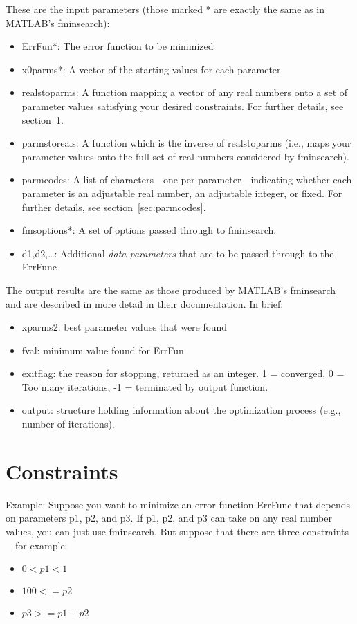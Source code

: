 \documentclass{article}
\begin{document}
These are the input parameters (those marked * are exactly the same as in MATLAB's fminsearch):
\begin{itemize}
\item ErrFun*:  The error function to be minimized
\item x0parms*: A vector of the starting values for each parameter
\item realstoparms: A function mapping a vector of any real numbers onto a set of parameter values
                    satisfying your desired constraints.  For further details, see section~\ref{sec:constraints}.
\item parmstoreals: A function which is the inverse of realstoparms (i.e., maps your parameter values
                    onto the full set of real numbers considered by fminsearch).
\item parmcodes: A list of characters---one per parameter---indicating whether each parameter is
                 an adjustable real number, an adjustable integer, or fixed.
                 For further details, see section~\ref{sec:parmcodes}.
\item fmsoptions*: A set of options passed through to fminsearch.
\item d1,d2,\ldots: Additional \emph{data parameters} that are to be passed through to the ErrFunc
\end{itemize}

The output results are the same as those produced by MATLAB's fminsearch and are described in more
detail in their documentation.  In brief:
\begin{itemize}
\item xparms2: best parameter values that were found
\item fval: minimum value found for ErrFun
\item exitflag: the reason for stopping, returned as an integer.  1 = converged, 0 = Too many iterations,  -1 = terminated by output function.
\item output: structure holding information about the optimization process (e.g., number of iterations).
\end{itemize}

\section{Constraints}
\label{sec:constraints}

Example: Suppose you want to minimize an error function ErrFunc that depends on parameters p1, p2, and p3.
If p1, p2, and p3 can take on any real number values, you can just use fminsearch.
But suppose that there are three constraints---for example:
\begin{itemize}
\item $0<p1<1$
\item $100<=p2$
\item $p3>=p1+p2$
\end{itemize}
\end{document}
